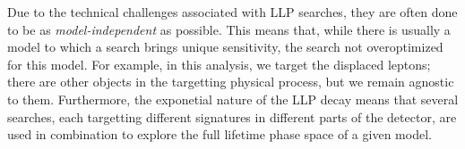 Due to the technical challenges associated with \ac{LLP} searches, they are often done to be as \emph{model-independent} as possible. This means that, while there is usually a model to which a search brings unique sensitivity, the search not overoptimized for this model. For example, in this analysis, we target the displaced leptons; there are other objects in the targetting physical process, but we remain agnostic to them. Furthermore, the exponetial nature of the \ac{LLP} decay means that several searches, each targetting different signatures in different parts of the detector, are used in combination to explore the full lifetime phase space of a given model.




